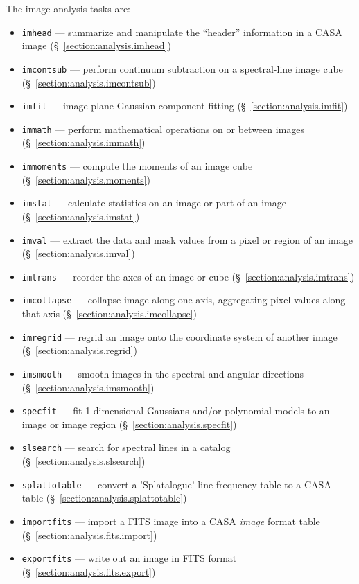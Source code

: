 The image analysis tasks are:
\begin{itemize}
   \item {\tt imhead} --- summarize and manipulate the ``header'' 
         information in a CASA image 
         (\S~\ref{section:analysis.imhead})
   \item {\tt imcontsub} --- perform continuum subtraction on a
         spectral-line image cube 
         (\S~\ref{section:analysis.imcontsub})
   \item {\tt imfit} --- image plane Gaussian component fitting
         (\S~\ref{section:analysis.imfit})
   \item {\tt immath} --- perform mathematical operations on or
         between images
         (\S~\ref{section:analysis.immath})
   \item {\tt immoments} --- compute the moments of an image cube
         (\S~\ref{section:analysis.moments})
   \item {\tt imstat} --- calculate statistics on an image or part
         of an image
         (\S~\ref{section:analysis.imstat})
   \item {\tt imval} --- extract the data and mask values from a
         pixel or region of an image
         (\S~\ref{section:analysis.imval})
  \item {\tt imtrans} --- reorder the axes of an image or cube
         (\S~\ref{section:analysis.imtrans})
  \item {\tt imcollapse} --- collapse image along one axis, aggregating pixel values along that axis 
         (\S~\ref{section:analysis.imcollapse})
   \item {\tt imregrid} --- regrid an image onto the coordinate
         system of another image 
         (\S~\ref{section:analysis.regrid})
   \item {\tt imsmooth} --- smooth images in the spectral and angular directions
         (\S~\ref{section:analysis.imsmooth})
   \item{\tt specfit} --- fit 1-dimensional Gaussians and/or
     polynomial models to an image or image region 
          (\S~\ref{section:analysis.specfit})
  \item{\tt slsearch} --- search for spectral lines in a catalog
          (\S~\ref{section:analysis.slsearch})
  \item{\tt splattotable} --- convert a 'Splatalogue' line frequency
    table to a CASA table 
          (\S~\ref{section:analysis.splattotable})




   \item {\tt importfits} --- import a FITS image into a CASA  
         {\it image} format table 
         (\S~\ref{section:analysis.fits.import})
   \item {\tt exportfits} --- write out an image in FITS format
         (\S~\ref{section:analysis.fits.export})
\end{itemize}

